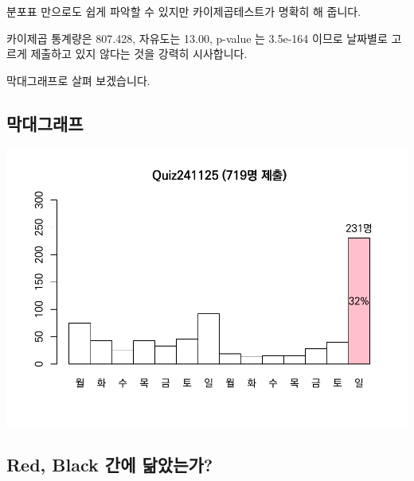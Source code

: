 \documentclass[
]{book}
\begin{document}
분포표 만으로도 쉽게 파악할 수 있지만 카이제곱테스트가 명확히 해 줍니다.

카이제곱 통계량은 807.428, 자유도는 13.00, p-value 는 3.5e-164 이므로 날짜별로 고르게 제출하고 있지 않다는 것을 강력히 시사합니다.

막대그래프로 살펴 보겠습니다.

\subsection{막대그래프}\label{uxb9c9uxb300uxadf8uxb798uxd504-14}

\includegraphics{Quiz_report_2025_files/figure-latex/unnamed-chunk-412-1.pdf}

\subsection{Red, Black 간에 닮았는가?}\label{red-black-uxac04uxc5d0-uxb2eeuxc558uxb294uxac00-12}
\end{document}
